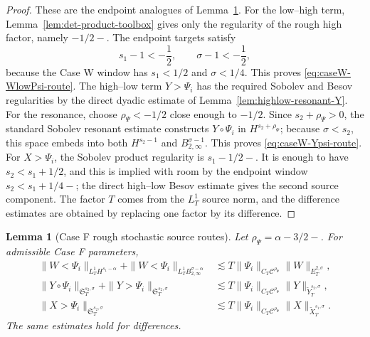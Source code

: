 \documentclass[10pt]{amsart}
\numberwithin{equation}{section}
\theoremstyle{plain}
\newtheorem{lemma}[theorem]{Lemma}
\theoremstyle{definition}
\theoremstyle{remark}
\begin{document}
\begin{proof}
These are the endpoint analogues of Lemma~\ref{lem:caseF-rough-stochastic-routes}.  For the low--high term, Lemma~\ref{lem:det-product-toolbox} gives only the regularity of the rough high factor, namely \(-1/2-\).  The endpoint targets satisfy
\[
        s_1-1<-\frac12,
        \qquad
        \sigma-1<-\frac12,
\]
because the Case W window has \(s_1<1/2\) and \(\sigma<1/4\).  This proves \eqref{eq:caseW-WlowPsi-route}.  The high--low term \(Y>\Psi_i\) has the required Sobolev and Besov regularities by the direct dyadic estimate of Lemma~\ref{lem:highlow-resonant-Y}.  For the resonance, choose \(\rho_\Psi<-1/2\) close enough to \(-1/2\).  Since \(s_2+\rho_\Psi>0\), the standard Sobolev resonant estimate constructs \(Y\circ\Psi_i\) in \(H^{s_2+\rho_\Psi}\); because \(\sigma<s_2\), this space embeds into both \(H^{s_2-1}\) and \(B_{2,\infty}^{\sigma-1}\).  This proves \eqref{eq:caseW-Ypsi-route}.  For \(X>\Psi_i\), the Sobolev product regularity is \(s_1-1/2-\).  It is enough to have \(s_2<s_1+1/2\), and this is implied with room by the endpoint window \(s_2<s_1+1/4-\); the direct high--low Besov estimate gives the second source component.  The factor \(T\) comes from the \(L_T^1\) source norm, and the difference estimates are obtained by replacing one factor by its difference.
\end{proof}

\begin{lemma}[Case F rough stochastic source routes]\label{lem:caseF-rough-stochastic-routes}
Let $\rho_\Psi=\alpha-3/2-$.  For admissible Case F parameters,
\begin{align}
\|W<\Psi_i\|_{L_T^1H^{s_1-\alpha}}
+\|W<\Psi_i\|_{L_T^1B_{2,\infty}^{\sigma-\alpha}}
&\lesssim T\|\Psi_i\|_{C_T\mathcal C^{\rho_\Psi}}\|W\|_{E_T^{2,\sigma}},\label{eq:caseF-WlowPsi-route}\\
\|Y\circ\Psi_i\|_{\mathfrak S_T^{s_2,\sigma}}
+\|Y>\Psi_i\|_{\mathfrak S_T^{s_2,\sigma}}
&\lesssim T\|\Psi_i\|_{C_T\mathcal C^{\rho_\Psi}}\|Y\|_{\widetilde Y_T^{s_2,\sigma}},\label{eq:caseF-Ypsi-route}\\
\|X>\Psi_i\|_{\mathfrak S_T^{s_2,\sigma}}
&\lesssim T\|\Psi_i\|_{C_T\mathcal C^{\rho_\Psi}}\|X\|_{\widetilde X_T^{s_1,\sigma}}.\label{eq:caseF-XgreaterPsi-route}
\end{align}
The same estimates hold for differences.
\end{lemma}
\end{document}
